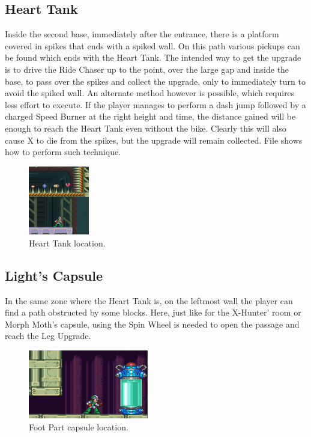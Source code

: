 \subsection{Heart Tank}
Inside the second base, immediately after the entrance, there is a platform covered in spikes that ends with a spiked wall. On this path various pickups can be found which ends with the Heart Tank. The intended way to get the upgrade is to drive the Ride Chaser up to the point, over the large gap and inside the base, to pass over the spikes and collect the upgrade, only to immediately turn to avoid the spiked wall. An alternate method however is possible, which requires less effort to execute. If the player manages to perform a dash jump followed by a charged Speed Burner at the right height and time, the distance gained will be enough to reach the Heart Tank even without the bike. Clearly this will also cause X to die from the spikes, but the upgrade will remain collected. File  shows how to perform such technique.
\begin{figure}[htp]
	\centering
	\includegraphics[height=3cm]{figures/X2/Overdrive_ostrich/Ostrich_heart.png}
	\caption{Heart Tank location.}
\end{figure}

\subsection{Light's Capsule}\label{X2:Foot_parts}
In the same zone where the Heart Tank is, on the leftmost wall the player can find a path obstructed by some blocks. Here, just like for the X-Hunter' room or Morph Moth's capsule, using the Spin Wheel is needed to open the passage and reach the Leg Upgrade.
\begin{figure}[htp]
	\centering
	\includegraphics[height=3cm]{figures/X2/Overdrive_ostrich/Ostrich_capsule.jpg}
	\caption{Foot Part capsule location.}
\end{figure}

